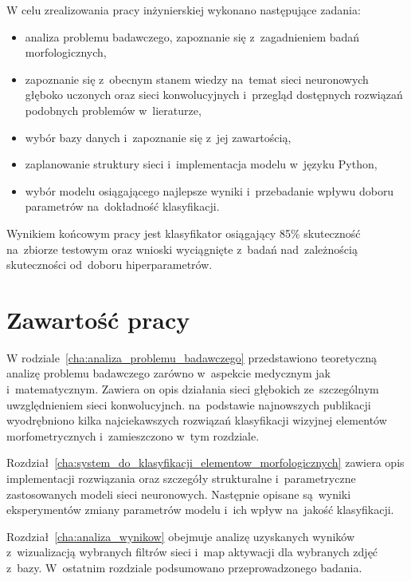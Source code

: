 {\parindent0pt %
W celu zrealizowania pracy inżynierskiej wykonano następujące zadania:
}
\begin{itemize}
\item analiza problemu badawczego, zapoznanie się z~zagadnieniem badań morfologicznych,
\item zapoznanie się z~obecnym stanem wiedzy na~temat sieci neuronowych głęboko uczonych oraz sieci konwolucyjnych i~przegląd dostępnych rozwiązań podobnych problemów w~lieraturze,
\item wybór bazy danych i~zapoznanie się z~jej zawartością,
\item zaplanowanie struktury sieci i~implementacja modelu w~języku Python,
\item wybór modelu osiągającego najlepsze wyniki i~przebadanie wpływu doboru parametrów na~dokładność klasyfikacji.
\end{itemize}

{\parindent0pt %
Wynikiem końcowym pracy jest klasyfikator osiągający 85\% skuteczność na~zbiorze testowym oraz wnioski wyciągnięte z~badań nad~zależnością skuteczności od~doboru hiperparametrów.
}
\section{Zawartość pracy}
\label{sec:zawartosc_pracy}

W rodziale~\ref{cha:analiza_problemu_badawczego} przedstawiono teoretyczną analizę problemu badawczego zarówno w~aspekcie medycznym jak i~matematycznym. Zawiera on opis działania sieci głębokich ze~szczególnym uwzględnieniem sieci konwolucyjnch. na~podstawie najnowszych publikacji wyodrębniono kilka najciekawszych rozwiązań klasyfikacji wizyjnej elementów morfometrycznych i~zamieszczono w~tym rozdziale.

{\parindent0pt %
Rozdział~\ref{cha:system_do_klasyfikacji_elementow_morfologicznych} zawiera opis implementacji rozwiązania oraz szczegóły strukturalne i~parametryczne zastosowanych modeli sieci neuronowych. Następnie opisane są~wyniki eksperymentów zmiany parametrów modelu i~ich wpływ na~jakość klasyfikacji.

Rozdział~\ref{cha:analiza_wynikow} obejmuje analizę uzyskanych wyników z~wizualizacją wybranych filtrów sieci i~map aktywacji dla wybranych zdjęć z~bazy. W~ostatnim rozdziale podsumowano przeprowadzonego badania.
}